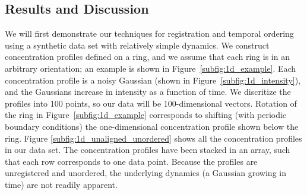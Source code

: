 \documentclass{pnastwo}
\begin{document}
\begin{article}
\section{Results and Discussion}


We will first demonstrate our techniques for registration and temporal ordering using a synthetic data set with relatively simple dynamics.
%
We construct concentration profiles defined on a ring, and we assume that each ring is in an arbitrary orientation; an example is shown in Figure~\ref{subfig:1d_example}.
%
Each concentration profile is a noisy Gaussian (shown in Figure~\ref{subfig:1d_intensity}), and the Gaussians increase in intensity as  a function of time.
%
We discritize the profiles into 100 points, so our data will be 100-dimensional vectors. 
%
Rotation of the ring in Figure~\ref{subfig:1d_example} corresponds to shifting (with periodic boundary conditions) the one-dimensional concentration profile shown below the ring. 
%
Figure \ref{subfig:1d_unaligned_unordered} shows all the concentration profiles in our data set. 
%
The concentration profiles have been stacked in an array, such that each row corresponds to one data point.
%
Because the profiles are unregistered and unordered, the underlying dynamics (a Gaussian growing in time) are not readily apparent.


\end{article}
\end{document}
